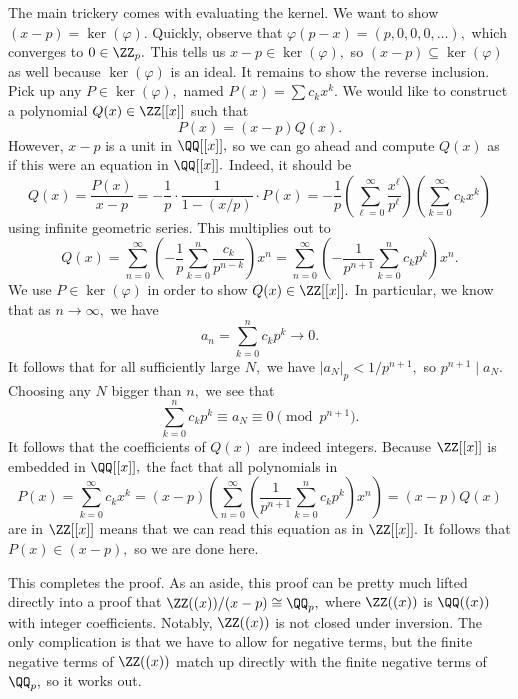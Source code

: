 The main trickery comes with evaluating the kernel. We want to show $(x-p)=\ker(\varphi).$ Quickly, observe that $\varphi(p-x)=(p,0,0,0,\ldots),$ which converges to $0\in\ZZ_p.$ This tells us $x-p\in\ker(\varphi),$ so $(x-p)\subseteq\ker(\varphi)$ as well because $\ker(\varphi)$ is an ideal. It remains to show the reverse inclusion. Pick up any $P\in\ker(\varphi),$ named $P(x)=\sum c_kx^k.$ We would like to construct a polynomial $Q(x)\in\ZZ[[x]]$ such that
\[P(x)=(x-p)Q(x).\]
However, $x-p$ is a unit in $\QQ[[x]],$ so we can go ahead and compute $Q(x)$ as if this were an equation in $\QQ[[x]].$ Indeed, it should be
\[Q(x)=\frac{P(x)}{x-p}=-\frac1p\cdot\frac1{1-(x/p)}\cdot P(x)=-\frac1p\left(\sum_{\ell=0}^\infty\frac{x^\ell}{p^\ell}\right)\left(\sum_{k=0}^\infty c_kx^k\right)\]
using infinite geometric series. This multiplies out to
\[Q(x)=\sum_{n=0}^\infty\left(-\frac1p\sum_{k=0}^n\frac{c_k}{p^{n-k}}\right)x^n=\sum_{n=0}^\infty\left(-\frac1{p^{n+1}}\sum_{k=0}^nc_kp^k\right)x^n.\]
We use $P\in\ker(\varphi)$ in order to show $Q(x)\in\ZZ[[x]].$ In particular, we know that as $n\to\infty,$ we have
\[a_n=\sum_{k=0}^nc_kp^k\to0.\]
It follows that for all sufficiently large $N,$ we have $|a_N|_p<1/p^{n+1},$ so $p^{n+1}\mid a_N.$ Choosing any $N$ bigger than $n,$ we see that
\[\sum_{k=0}^nc_kp^k\equiv a_N\equiv0\pmod{p^{n+1}}.\]
It follows that the coefficients of $Q(x)$ are indeed integers. Because $\ZZ[[x]]$ is embedded in $\QQ[[x]],$ the fact that all polynomials in
\[P(x)=\sum_{k=0}^\infty c_kx^k=(x-p)\left(\sum_{n=0}^\infty\left(\frac1{p^{n+1}}\sum_{k=0}^nc_kp^k\right)x^n\right)=(x-p)Q(x)\]
are in $\ZZ[[x]]$ means that we can read this equation as in $\ZZ[[x]].$ It follows that $P(x)\in(x-p),$ so we are done here.

This completes the proof. As an aside, this proof can be pretty much lifted directly into a proof that $\ZZ((x))/(x-p)\cong\QQ_p,$ where $\ZZ((x))$ is $\QQ((x))$ with integer coefficients. Notably, $\ZZ((x))$ is not closed under inversion. The only complication is that we have to allow for negative terms, but the finite negative terms of $\ZZ((x))$ match up directly with the finite negative terms of $\QQ_p,$ so it works out.

